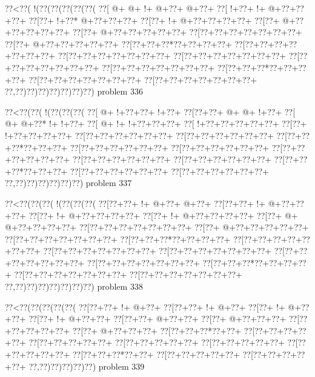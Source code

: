\vbox{\vbox{\goo
\0??<\0??(\- !(\0??(\0??(\0??(\0??(\0??(
\0??[\- @+\- @+\- !+\- @+\0??+\- @+\0??+
\0??[\- !+\0??+\- !+\- @+\0??+\0??+\0??+
\0??[\0??+\- !+\0??*\- @+\0??+\0??+\0??+
\0??[\0??+\- !+\- @+\0??+\0??+\0??+\0??+
\0??[\0??+\- @+\0??+\0??+\0??+\0??+\0??+
\0??[\0??+\- @+\0??+\0??+\0??+\0??+\0??+
\0??[\0??+\0??+\0??+\0??+\0??+\0??+\0??+
\0??[\0??+\- @+\0??+\0??+\0??+\0??+\0??+
\0??[\0??+\0??+\0??*\0??+\0??+\0??+\0??+
\0??[\0??+\0??+\0??+\0??+\0??+\0??+\0??+
\0??[\0??+\0??+\0??+\0??+\0??+\0??+\0??+
\0??[\0??+\0??+\0??+\0??+\0??+\0??+\0??+
\0??[\0??+\0??+\0??+\0??+\0??+\0??+\0??+
\0??[\0??+\0??+\0??+\0??+\0??+\0??+\0??+
\0??[\0??+\0??+\0??*\0??+\0??+\0??+\0??+
\0??[\0??+\0??+\0??+\0??+\0??+\0??+\0??+
\0??[\0??+\0??+\0??+\0??+\0??+\0??+\0??+
\0??,\0??)\0??)\0??)\0??)\0??)\0??)\0??)
}
\hfil problem 336\hfil\break
}

\vbox{\vbox{\goo
\0??<\0??(\0??(\- !(\0??(\0??(\0??(
\0??[\- @+\- !+\0??+\0??+\- !+\0??+
\0??[\0??+\0??+\- @+\- @+\- !+\0??+
\0??[\- @+\- @+\0??*\- !+\- !+\0??+
\0??[\- @+\- !+\- !+\0??+\0??+\0??+
\0??[\- !+\0??+\0??+\0??+\0??+\0??+
\0??[\0??+\- !+\0??+\0??+\0??+\0??+
\0??[\0??+\0??+\0??+\0??+\0??+\0??+
\0??[\0??+\0??+\0??+\0??+\0??+\0??+
\0??[\0??+\0??+\0??*\0??+\0??+\0??+
\0??[\0??+\0??+\0??+\0??+\0??+\0??+
\0??[\0??+\0??+\0??+\0??+\0??+\0??+
\0??[\0??+\0??+\0??+\0??+\0??+\0??+
\0??[\0??+\0??+\0??+\0??+\0??+\0??+
\0??[\0??+\0??+\0??+\0??+\0??+\0??+
\0??[\0??+\0??+\0??*\0??+\0??+\0??+
\0??[\0??+\0??+\0??+\0??+\0??+\0??+
\0??[\0??+\0??+\0??+\0??+\0??+\0??+
\0??,\0??)\0??)\0??)\0??)\0??)\0??)
}
\hfil problem 337\hfil\break
}

\vbox{\vbox{\goo
\0??<\0??(\0??(\0??(\- !(\0??(\0??(\0??(
\0??[\0??+\0??+\- !+\- @+\0??+\- @+\0??+
\0??[\0??+\0??+\- !+\- @+\0??+\0??+\0??+
\0??[\0??+\- !+\- @+\0??+\0??+\0??+\0??+
\0??[\0??+\- !+\- @+\0??+\0??+\0??+\0??+
\0??[\0??+\- @+\- @+\0??+\0??+\0??+\0??+
\0??[\0??+\0??+\0??+\0??+\0??+\0??+\0??+
\0??[\0??+\- @+\0??+\0??+\0??+\0??+\0??+
\0??[\0??+\0??+\0??+\0??+\0??+\0??+\0??+
\0??[\0??+\0??+\0??*\0??+\0??+\0??+\0??+
\0??[\0??+\0??+\0??+\0??+\0??+\0??+\0??+
\0??[\0??+\0??+\0??+\0??+\0??+\0??+\0??+
\0??[\0??+\0??+\0??+\0??+\0??+\0??+\0??+
\0??[\0??+\0??+\0??+\0??+\0??+\0??+\0??+
\0??[\0??+\0??+\0??+\0??+\0??+\0??+\0??+
\0??[\0??+\0??+\0??*\0??+\0??+\0??+\0??+
\0??[\0??+\0??+\0??+\0??+\0??+\0??+\0??+
\0??[\0??+\0??+\0??+\0??+\0??+\0??+\0??+
\0??,\0??)\0??)\0??)\0??)\0??)\0??)\0??)
}
\hfil problem 338\hfil\break
}

\vbox{\vbox{\goo
\0??<\0??(\0??(\0??(\0??(\0??(
\0??[\0??+\0??+\- !+\- @+\0??+
\0??[\0??+\0??+\- !+\- @+\0??+
\0??[\0??+\- !+\- @+\0??+\0??+
\0??[\0??+\- !+\- @+\0??+\0??+
\0??[\0??+\0??+\- @+\0??+\0??+
\0??[\0??+\- @+\0??+\0??+\0??+
\0??[\0??+\0??+\0??+\0??+\0??+
\0??[\0??+\- @+\0??+\0??+\0??+
\0??[\0??+\0??+\0??*\0??+\0??+
\0??[\0??+\0??+\0??+\0??+\0??+
\0??[\0??+\0??+\0??+\0??+\0??+
\0??[\0??+\0??+\0??+\0??+\0??+
\0??[\0??+\0??+\0??+\0??+\0??+
\0??[\0??+\0??+\0??+\0??+\0??+
\0??[\0??+\0??+\0??*\0??+\0??+
\0??[\0??+\0??+\0??+\0??+\0??+
\0??[\0??+\0??+\0??+\0??+\0??+
\0??,\0??)\0??)\0??)\0??)\0??)
}
\hfil problem 339\hfil\break
}

